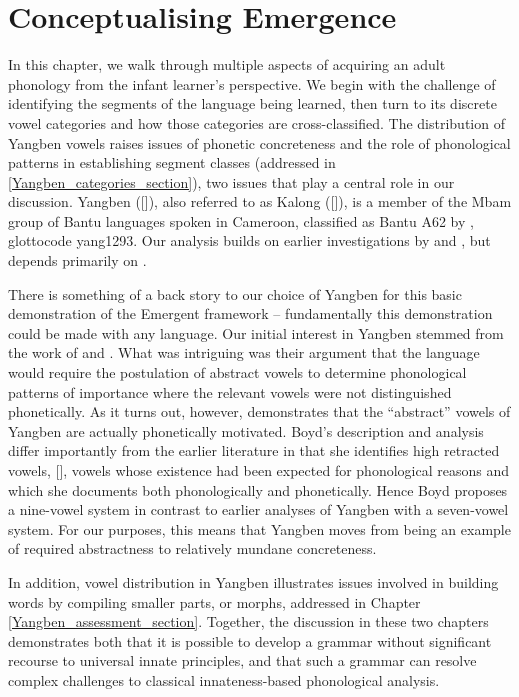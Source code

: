 \chapter{Conceptualising Emergence}\label{Yangbenn}
\label{ch2}
In this chapter, we walk through multiple aspects of acquiring an adult phonology from the infant learner's perspective. We begin with the challenge of identifying the segments of the language being learned, then turn to its discrete vowel categories and how those categories are cross-classified. The distribution of Yangben vowels raises issues of phonetic concreteness and the role of phonological patterns in establishing segment classes (addressed in \Sec\ref{Yangben_categories_section}), two issues that  play a central role in our discussion. Yangben ([]), also referred to as Kalong ([]), is a member of the Mbam group of Bantu languages spoken in Cameroon, classified as Bantu A62 by \citet{Guthrie:1967-71},  glottocode yang1293. Our analysis builds on earlier investigations by \citet{Paulian:1986} and \citet{Hyman:2003kalong}, but depends primarily on \citet{Boyd:2015}.

There is something of a back story to our choice of Yangben for this basic demonstration of the {Emergent framework} -- fundamentally this demonstration could be made with any language. Our initial interest in Yangben stemmed from the work of \citet{Paulian:1986} and \citet{Hyman:2003kalong}. What was intriguing was their argument that the language would require the postulation of abstract vowels to determine phonological patterns of importance where the relevant vowels were not distinguished phonetically. As it turns out, however, \citet{Boyd:2015} demonstrates that the ``abstract'' vowels of Yangben are actually phonetically motivated. Boyd's description and analysis differ importantly from the earlier literature in that she identifies high retracted vowels, [], vowels whose existence had been expected for phonological reasons and which she documents both phonologically and phonetically. Hence Boyd  proposes a nine-vowel system in contrast to earlier analyses of Yangben with a seven-vowel system. For our purposes, this means that Yangben moves from being an example of required abstractness to relatively mundane concreteness.

In addition, vowel distribution in Yangben illustrates issues involved in building words by compiling smaller parts, or morphs, addressed in Chapter \ref{Yangben_assessment_section}.  Together, the discussion in these two chapters demonstrates both that it is possible to develop a grammar without significant recourse to universal innate principles, and that {such a grammar can resolve complex challenges} to classical innateness-based phonological analysis. 


